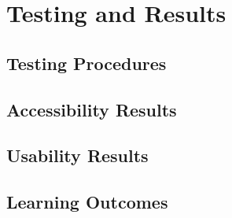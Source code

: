 \chapter{Testing and Results}

\section{Testing Procedures}

\section{Accessibility Results}

\section{Usability Results}

\section{Learning Outcomes}
